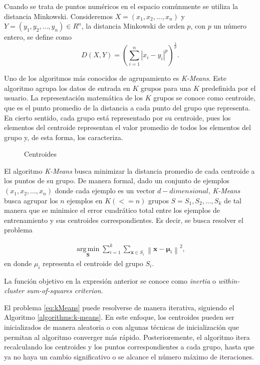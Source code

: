 Cuando se trata de puntos numéricos en el espacio comúnmente se utiliza la distancia Minkowski. Consideremos $X = (x_1,x_2,\ldots,x_n)$ y $Y=(y_1,y_2,\ldots ,y_n) \in R^n$, la distancia Minkowski de orden $p$, con $p$ un número entero, se define como 
$$D(X,Y) = (\sum_{i=1}^{n}|x_{i}-y_{i}|^{p})^{\frac{1}{p}}.$$

Uno de los algoritmos más conocidos de agrupamiento es \textit{K-Means}. Este algoritmo agrupa los datos de entrada en $K$ grupos para una $K$ predefinida por el usuario. La representación matemática de los $K$ grupos se conoce como centroide, que es el punto promedio de la distancia a cada punto del grupo que representa. En cierto sentido, cada grupo está representado por su centroide, pues los elementos del centroide representan el valor promedio de todos los elementos del grupo y, de esta forma, los caracteriza.

 \begin{figure}[htbp]
   \centering
   
    \caption{Centroides}
    \label{fig:centroides}
\end{figure}

El algoritmo \textit{K-Means} busca minimizar la distancia promedio de cada centroide a los puntos de su grupo. De manera formal, dado un conjunto de ejemplos $(x_1, x_2, ..., x_n)$ donde cada ejemplo es un vector $d-dimensional$, \textit{K-Means} busca agrupar los $n$ ejemplos en $K(<=n)$ grupos $S = {S_1, S_2, ..., S_k}$ de tal manera que se minimice el error cuadrático total entre los ejemplos de entrenamiento y sus centroides correspondientes. Es decir, se busca resolver el problema 

\begin{align} \label{eq:kMeans}
\displaystyle {\underset {\mathbf {S} }{\operatorname {arg\,min} }}\sum _{i=1}^{k}\sum _{\mathbf {x} \in S_{i}}\left\|\mathbf {x} -{\boldsymbol {\mu }}_{i}\right\|^{2},
\end{align}
en donde $\mu_i$ representa el centroide del grupo $S_i$. 

La función objetivo en la expresión anterior se conoce como \textit{inertia} o \textit{within-cluster sum-of-squares criterion}.

El problema \ref{eq:kMeans} puede resolverse de manera iterativa, siguiendo el Algoritmo \ref{algorithms:k-means}. En este enfoque, los centroides pueden ser inicializados de manera aleatoria o con algunas técnicas de inicialización que permitan al algoritmo converger más rápido. Posterioremente, el algoritmo itera recalculando los centroides y los puntos correspondientes a cada grupo, hasta que ya no haya un cambio significativo o se alcance el número máximo de iteraciones. 

